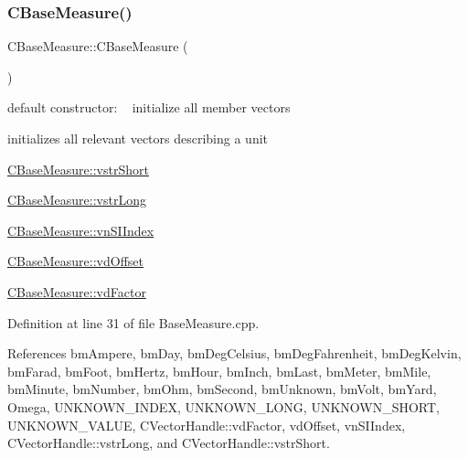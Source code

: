 \subsubsection{\texorpdfstring{C\+Base\+Measure()}{CBaseMeasure()}}
{\footnotesize\ttfamily C\+Base\+Measure\+::\+C\+Base\+Measure (\begin{DoxyParamCaption}{ }\end{DoxyParamCaption})}



default constructor\+: ~\newline
 initialize all member vectors 

initializes all relevant vectors describing a unit


\begin{DoxyItemize}
\item \hyperlink{classCVectorHandle_afb50c8a33d4cf70bf92c644dca409ea2}{C\+Base\+Measure\+::vstr\+Short}
\item \hyperlink{classCVectorHandle_a71bec0e385b9ca8e5ffa174b559da9f8}{C\+Base\+Measure\+::vstr\+Long}
\item \hyperlink{classCBaseMeasure_aaaddf8a6ce321b282885953439472390}{C\+Base\+Measure\+::vn\+S\+I\+Index}
\item \hyperlink{classCBaseMeasure_a7220e3dfd4fbdd319a5c3c6af844259e}{C\+Base\+Measure\+::vd\+Offset}
\item \hyperlink{classCVectorHandle_af8f8b2e0da8363e695872ca85f33364e}{C\+Base\+Measure\+::vd\+Factor} 
\end{DoxyItemize}

Definition at line 31 of file Base\+Measure.\+cpp.



References bm\+Ampere, bm\+Day, bm\+Deg\+Celsius, bm\+Deg\+Fahrenheit, bm\+Deg\+Kelvin, bm\+Farad, bm\+Foot, bm\+Hertz, bm\+Hour, bm\+Inch, bm\+Last, bm\+Meter, bm\+Mile, bm\+Minute, bm\+Number, bm\+Ohm, bm\+Second, bm\+Unknown, bm\+Volt, bm\+Yard, Omega, U\+N\+K\+N\+O\+W\+N\+\_\+\+I\+N\+D\+EX, U\+N\+K\+N\+O\+W\+N\+\_\+\+L\+O\+NG, U\+N\+K\+N\+O\+W\+N\+\_\+\+S\+H\+O\+RT, U\+N\+K\+N\+O\+W\+N\+\_\+\+V\+A\+L\+UE, C\+Vector\+Handle\+::vd\+Factor, vd\+Offset, vn\+S\+I\+Index, C\+Vector\+Handle\+::vstr\+Long, and C\+Vector\+Handle\+::vstr\+Short.

\mbox{\label{classCBaseMeasure_aca2735196a7e6e6524d73327d95d4a19}} 
